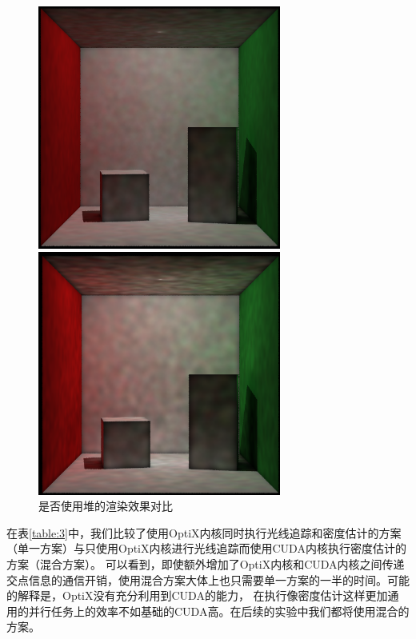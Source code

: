 \documentclass[UTF8]{ctexart}
\begin{document}
        \begin{figure}[htbp]
        \centering
        \begin{minipage}[t]{0.48\textwidth}
        \centering
        \includegraphics[width=8cm]{pic/useheap.png}
        \end{minipage}
        \begin{minipage}[t]{0.48\textwidth}
        \centering
        \includegraphics[width=8cm]{pic/withoutHeap.png}
        \end{minipage}
        \caption{是否使用堆的渲染效果对比}
        \label{fig:8}
        \end{figure}
        
        在表\ref{table:3}中，我们比较了使用OptiX内核同时执行光线追踪和密度估计的方案（单一方案）与只使用OptiX内核进行光线追踪而使用CUDA内核执行密度估计的方案（混合方案）。
        可以看到，即使额外增加了OptiX内核和CUDA内核之间传递交点信息的通信开销，使用混合方案大体上也只需要单一方案的一半的时间。可能的解释是，OptiX没有充分利用到CUDA的能力，
        在执行像密度估计这样更加通用的并行任务上的效率不如基础的CUDA高。在后续的实验中我们都将使用混合的方案。
        
\end{document}
